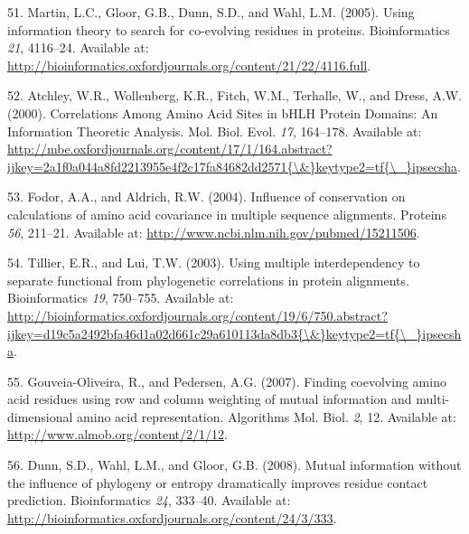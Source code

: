 \documentclass[11pt,a4paper,twoside]{book}
\theoremstyle{definition}
\theoremstyle{definition}
\theoremstyle{remark}
\begin{document}
\hypertarget{ref-Martin2005}{}
51. Martin, L.C., Gloor, G.B., Dunn, S.D., and Wahl, L.M. (2005). Using
information theory to search for co-evolving residues in proteins.
Bioinformatics \emph{21}, 4116--24. Available at:
\url{http://bioinformatics.oxfordjournals.org/content/21/22/4116.full}.

\hypertarget{ref-Atchley2000}{}
52. Atchley, W.R., Wollenberg, K.R., Fitch, W.M., Terhalle, W., and
Dress, A.W. (2000). Correlations Among Amino Acid Sites in bHLH Protein
Domains: An Information Theoretic Analysis. Mol. Biol. Evol. \emph{17},
164--178. Available at:
\href{http://mbe.oxfordjournals.org/content/17/1/164.abstract?ijkey=2a1f0a044a8fd2213955e4f2c17fa84682dd2571\%7B/\&\%7Dkeytype2=tf\%7B/_\%7Dipsecsha}{http://mbe.oxfordjournals.org/content/17/1/164.abstract?ijkey=2a1f0a044a8fd2213955e4f2c17fa84682dd2571\{\textbackslash{}\&\}keytype2=tf\{\textbackslash{}\_\}ipsecsha}.

\hypertarget{ref-Fodor2004}{}
53. Fodor, A.A., and Aldrich, R.W. (2004). Influence of conservation on
calculations of amino acid covariance in multiple sequence alignments.
Proteins \emph{56}, 211--21. Available at:
\url{http://www.ncbi.nlm.nih.gov/pubmed/15211506}.

\hypertarget{ref-Tillier2003}{}
54. Tillier, E.R., and Lui, T.W. (2003). Using multiple interdependency
to separate functional from phylogenetic correlations in protein
alignments. Bioinformatics \emph{19}, 750--755. Available at:
\href{http://bioinformatics.oxfordjournals.org/content/19/6/750.abstract?ijkey=d19c5a2492bfa46d1a02d661c29a610113da8db3\%7B/\&\%7Dkeytype2=tf\%7B/_\%7Dipsecsha}{http://bioinformatics.oxfordjournals.org/content/19/6/750.abstract?ijkey=d19c5a2492bfa46d1a02d661c29a610113da8db3\{\textbackslash{}\&\}keytype2=tf\{\textbackslash{}\_\}ipsecsha}.

\hypertarget{ref-Gouveia_Oliveira2007}{}
55. Gouveia-Oliveira, R., and Pedersen, A.G. (2007). Finding coevolving
amino acid residues using row and column weighting of mutual information
and multi-dimensional amino acid representation. Algorithms Mol. Biol.
\emph{2}, 12. Available at: \url{http://www.almob.org/content/2/1/12}.

\hypertarget{ref-Dunn2008}{}
56. Dunn, S.D., Wahl, L.M., and Gloor, G.B. (2008). Mutual information
without the influence of phylogeny or entropy dramatically improves
residue contact prediction. Bioinformatics \emph{24}, 333--40. Available
at: \url{http://bioinformatics.oxfordjournals.org/content/24/3/333}.
\end{document}
